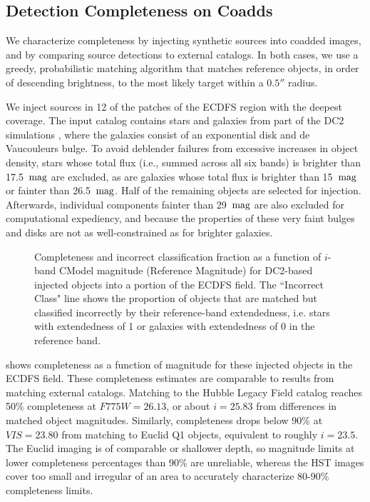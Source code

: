 \subsection{Detection Completeness on Coadds}
\label{ssec:detection_completeness}
We characterize completeness by injecting synthetic sources into coadded images, and by comparing source detections to external catalogs.
In both cases, we use a greedy, probabilistic matching \gls{algorithm} that matches reference objects, in order of descending brightness, to the most likely target within a $0.5''$ radius.

We inject sources in 12 of the patches of the \gls{ECDFS} region with the deepest coverage.
The input catalog contains stars and galaxies from part of the \gls{DC2} simulations \citep{2021ApJS..253...31L}, where the galaxies consist of an exponential disk and de Vaucouleurs \citep{1948AnAp...11..247D,1953MNRAS.113..134D} bulge.
To avoid deblender failures from excessive increases in object density, stars whose total \gls{flux} (i.e., summed across all six bands) is brighter than 17.5~${\rm mag}$ are excluded, as are galaxies whose total \gls{flux} is brighter than 15~${\rm mag}$ or fainter than 26.5~${\rm mag}$.
Half of the remaining objects are selected for injection.
Afterwards, individual components fainter than 29~${\rm mag}$ are also excluded for computational expediency, and because the properties of these very faint bulges and disks are not as well-constrained as for brighter galaxies.
\begin{figure}[htb]
\caption{Completeness and incorrect classification fraction as a function of $i$-band CModel magnitude (Reference Magnitude) for DC2-based injected objects into a portion of the ECDFS field. 
The ``Incorrect Class" line shows the proportion of objects that are matched but classified incorrectly by their reference-band extendedness, i.e. stars with extendedness of 1 or galaxies with extendedness of 0 in the reference band.}
\label{fig:injected_lsst_cells_v1_5063_i_completeness_any}
\end{figure}

 shows completeness as a function of magnitude for these injected objects in the \gls{ECDFS} field.
These completeness estimates are comparable to results from matching external catalogs. 
Matching to the Hubble Legacy Field catalog \citep{2016arXiv160600841I, 2019ApJS..244...16W} reaches 50\% completeness at $F775W=26.13$, or about $i=25.83$ from differences in matched object magnitudes.
Similarly, completeness drops below 90\% at $VIS=23.80$ from matching to Euclid Q1 \citep{2025arXiv250315305E} objects, equivalent to roughly $i=23.5$. 
The Euclid imaging is of comparable or shallower depth, so magnitude limits at lower completeness percentages than 90\% are unreliable, whereas the HST images cover too small and irregular of an area to accurately characterize 80-90\% completeness limits.

